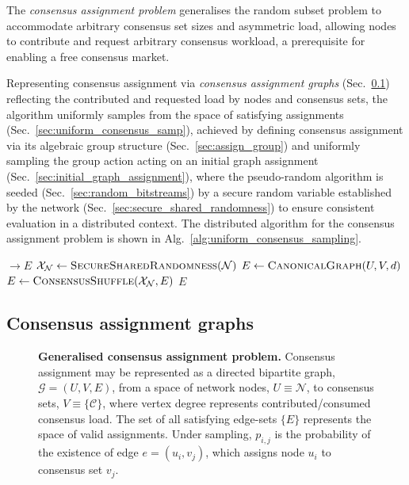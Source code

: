 \documentclass[twocolumn, aps, amsmath, amssymb, nofootinbib, superscriptaddress, longbibliography, floatfix, eqsecnum, rmp]{revtex4-2}
\let\oldalgorithmic\algorithmic
\let\endoldalgorithmic\endalgorithmic
\renewenvironment{algorithmic}
{\begin{adjustwidth}{-1em}{}\oldalgorithmic}
{\endoldalgorithmic\end{adjustwidth}}
\begin{document}
The \emph{consensus assignment problem} generalises the random subset problem to accommodate arbitrary consensus set sizes and asymmetric load, allowing nodes to contribute and request arbitrary consensus workload, a prerequisite for enabling a free consensus market.

Representing consensus assignment via \emph{consensus assignment graphs} (Sec.~\ref{sec:assign_graphs}) reflecting the contributed and requested load by nodes and consensus sets, the algorithm uniformly samples from the space of satisfying assignments (Sec.~\ref{sec:uniform_consensus_samp}), achieved by defining consensus assignment via its algebraic group structure (Sec.~\ref{sec:assign_group}) and uniformly sampling the group action acting on an initial graph assignment (Sec.~\ref{sec:initial_graph_assignment}), where the pseudo-random algorithm is seeded (Sec.~\ref{sec:random_bitstreams}) by a secure random variable established by the network (Sec.~\ref{sec:secure_shared_randomness}) to ensure consistent evaluation in a distributed context. The distributed algorithm for the consensus assignment problem is shown in Alg.~\ref{alg:uniform_consensus_sampling}.

\begin{algorithm}[H]
\begin{algorithmic}
 $\to E$ 
	\State $\mathcal{X}_\mathcal{N} \gets \textsc{SecureSharedRandomness}(\mathcal{N})$
	\State $E \gets \textsc{CanonicalGraph}(U,V,d)$
	\State $E \gets \textsc{ConsensusShuffle}(\mathcal{X}_\mathcal{N}, E)$
	\State \Return $E$
\EndFunction
\end{algorithmic}	
\caption{Distributed algorithm for the consensus assignment problem. A secure shared random variable (Sec.~\ref{sec:secure_shared_randomness}), $\mathcal{X}_\mathcal{N}$, collectively established by the network, $\mathcal{N}$, seeds pseudo-random sampling (Sec.~\ref{sec:uniform_consensus_samp}) over consensus assignments, $E$, satisfying the consensus assignment graph constraints, $(U,V,d)$ (Sec.~\ref{sec:assign_graphs}).} \label{alg:uniform_consensus_sampling}
\end{algorithm}

\subsection{Consensus assignment graphs} \label{sec:assign_graphs}

\begin{figure}[!htb]
	\centering
	
	\caption{\textbf{Generalised consensus assignment problem.} Consensus assignment may be represented as a directed bipartite graph, \mbox{$\mathcal{G}=(U,V,E)$}, from a space of network nodes, $U\equiv\mathcal{N}$, to consensus sets, $V\equiv\{\mathcal{C}\}$, where vertex degree represents contributed/consumed consensus load. The set of all satisfying edge-sets $\{E\}$ represents the space of valid assignments. Under sampling, $p_{i,j}$ is the probability of the existence of edge \mbox{$e=(u_i,v_j)$}, which assigns node $u_i$ to consensus set $v_j$.}\label{fig:bipartite_map}
\end{figure}
\end{document}
